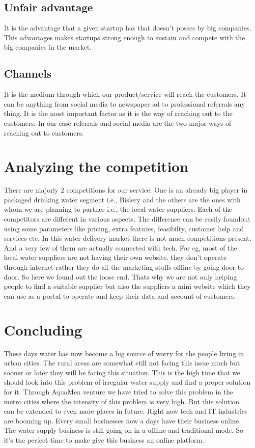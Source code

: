 \documentclass[a4paper, 12pt]{report}
\begin{document}
\subsection[short]{Unfair advantage}
It is the advantage that a given startup has that doesn't posses by big companies. This advantages makes startups strong enough to sustain and
compete with the big companies in the market.

\subsection[short]{Channels}
It is the medium through which our product/service will reach the customers. It can be anything from social media to newspaper ad to professional
referrals any thing. It is the most important factor as it is the way of reaching out to the customers. In our case referrals and social media 
are the two major ways of reaching out to customers.


\section{Analyzing the competition}
There are majorly 2 competitions for our service. One is an already big player in packaged drinking water segment i.e., Bislery and the others are the ones
with whom we are planning to partner i.e., the local water suppliers. Each of the competitors are different in various aspects. The difference can be easily foundout using some parameters like pricing, extra features, feasibilty, customer help and services etc. In this water delivery market there is not much 
competitions present. And a very few of them are actually connected with tech. For eg, most of the local water suppliers are not having their own website.
they don't operate through internet rather they do all the marketing stuffs offline by going door to door. So here we found out the loose end. Thats why we are not only helping people to find a suitable supplier but also the suppliers a mini website which they can use as a portal to operate and keep their data 
and account of customers. 


\section{Concluding}
These days water has now become a big source of worry for the people living in urban cities. The rural areas are somewhat still not facing this issue much but sooner or later they will be facing this situation. This is the high time that we should look into this problem of irregular water supply and find a proper solution for it. Through AquaMen venture we have tried to solve this problem in the metro cities where the intensity of this problem is very high. But this solution can be extended to even more places in future. Right now tech and IT industries are booming up. Every small businesses now a days have their business online. The water supply business is still going on in a offline and traditional mode. So it's the perfect time to make give this business an online platform.
\end{document}

